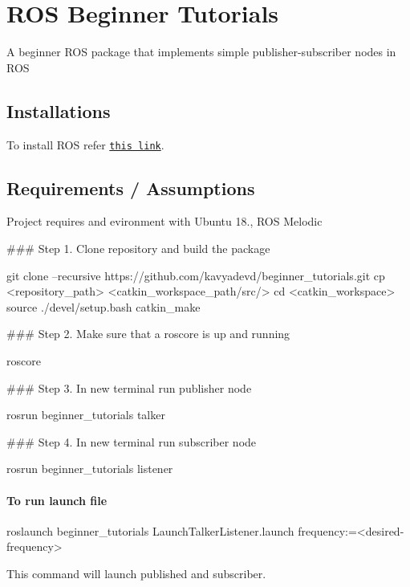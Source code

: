 \href{https://opensource.org/licenses/MIT}{\tt } \section*{R\+OS Beginner Tutorials}

A beginner R\+OS package that implements simple publisher-\/subscriber nodes in R\+OS

\subsection*{Installations}

To install R\+OS refer \href{http://wiki.ros.org/ROS/Installation}{\tt this link}.

\subsection*{Requirements / Assumptions}

Project requires and evironment with Ubuntu 18., R\+OS Melodic

\#\#\# Step 1. Clone repository and build the package 
\begin{DoxyCode}
git clone --recursive https://github.com/kavyadevd/beginner\_tutorials.git
cp <repository\_path> <catkin\_workspace\_path/src/>
cd <catkin\_workspace>
source ./devel/setup.bash
catkin\_make
\end{DoxyCode}


\#\#\# Step 2. Make sure that a roscore is up and running 
\begin{DoxyCode}
roscore
\end{DoxyCode}
 \#\#\# Step 3. In new terminal run publisher node 
\begin{DoxyCode}
rosrun beginner\_tutorials talker
\end{DoxyCode}
 \#\#\# Step 4. In new terminal run subscriber node 
\begin{DoxyCode}
rosrun beginner\_tutorials listener
\end{DoxyCode}


\paragraph*{To run launch file}


\begin{DoxyCode}
roslaunch beginner\_tutorials LaunchTalkerListener.launch frequency:=<desired-frequency>
\end{DoxyCode}
 This command will launch published and subscriber.

